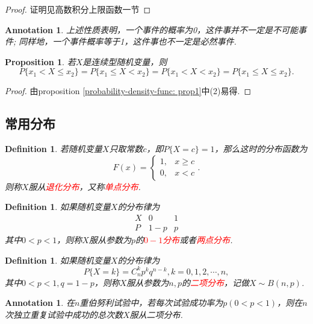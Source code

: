 \documentclass{article}
\newtheorem{proposition}[theorem]{Proposition}
\newtheorem{definition}[theorem]{Definition}
\newtheorem{annotation}[theorem]{Annotation}
\newcommand{\redt}[1]{\textcolor{red}{#1}}
\begin{document}
\begin{proof}
证明见高数积分上限函数一节
\end{proof}

\begin{annotation}
\rm {\color{blue}上述性质表明，一个事件的概率为0，这件事并不一定是不可能事件; 同样地，一个事件概率等于1，这件事也不一定是必然事件}. 
\end{annotation}

\begin{proposition}
\rm 若$X$是连续型随机变量，则
$$
P\{x_1 < X \leq x_2\} = P\{x_1 \leq X  < x_2\} = P\{x_1 < X < x_2\} = P\{x_1 \leq  X \leq x_2\}.
$$
\end{proposition}

\begin{proof}
由proposition \ref{probability-density-func: prop1}中(2)易得. 
\end{proof}


\subsection{常用分布}

\begin{definition}
\rm 若随机变量$X$只取常数$c$，即$P\{X=c\} = 1$，那么这时的分布函数为
$$
F(x) = \left\{\begin{array}{ll}
1, &x \geq c \\
0, &x < c
\end{array} \right. .
$$
则称$X$服从\redt{退化分布}，又称\redt{单点分布}. 
\end{definition}

\begin{definition}
\rm 如果随机变量$X$的分布律为
$$
\begin{array}{c|cc}
X & 0 & 1\\
\hline
P & 1-p & p
\end{array}
$$
其中$0 < p < 1$，则称$X$服从参数为$p$的\redt{$0 - 1$分布}或者\redt{两点分布}.
\end{definition}

\begin{definition}
\rm 如果随机变量$X$的分布律为
$$
P\{X = k\} = C_n^kp^kq^{n-k}, k = 0,1,2,\cdots,n,
$$
其中$0 < p < 1, q= 1- p$，则称$X$服从参数为$n,p$的\redt{二项分布}，记做$X \sim B(n,p)$.
\end{definition}

\begin{annotation}
\rm 在$n$重伯努利试验中，若每次试验成功率为$p(0 < p < 1)$，则在$n$次独立重复试验中成功的总次数$X$服从二项分布.
\end{annotation}
\end{document}
